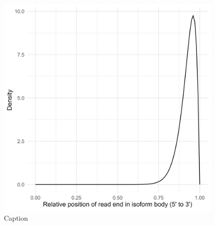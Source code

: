 \begin{figure}
    \centering
    \includegraphics{figures/position}
    \caption{Caption}
    \label{fig:my_label}
\end{figure}
